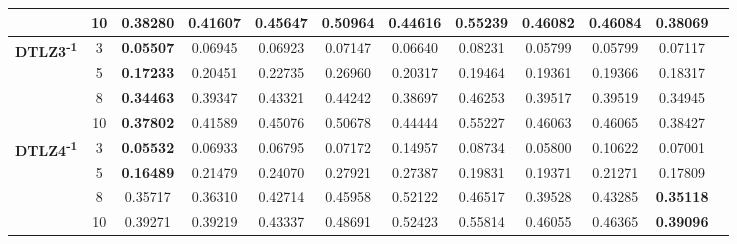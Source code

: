 \documentclass{sig-alternate}
\begin{document}
\begin{table*}[!htb]
\begin{tabular}{|c|c|c|c|c|c|c|c|c|c|c|c|}
                                                      & 10         & 0.38280          & 0.41607           & 0.45647               & 0.50964          & 0.44616             & 0.55239             & 0.46082            & 0.46084              & \textbf{0.38069} \\ \hline
\multirow{4}{*}{\textbf{DTLZ3\textsuperscript{-1}}} & 3          & \textbf{0.05507} & 0.06945           & 0.06923               & 0.07147          & 0.06640             & 0.08231             & 0.05799            & 0.05799              & 0.07117          \\ \cline{2-11} 
                                                      & 5          & \textbf{0.17233} & 0.20451           & 0.22735               & 0.26960          & 0.20317             & 0.19464             & 0.19361            & 0.19366              & 0.18317          \\ \cline{2-11} 
                                                      & 8          & \textbf{0.34463} & 0.39347           & 0.43321               & 0.44242          & 0.38697             & 0.46253             & 0.39517            & 0.39519              & 0.34945          \\ \cline{2-11} 
                                                      & 10         & \textbf{0.37802} & 0.41589           & 0.45076               & 0.50678          & 0.44444             & 0.55227             & 0.46063            & 0.46065              & 0.38427          \\ \hline
\multirow{4}{*}{\textbf{DTLZ4\textsuperscript{-1}}} & 3          & \textbf{0.05532} & 0.06933           & 0.06795               & 0.07172          & 0.14957             & 0.08734             & 0.05800            & 0.10622              & 0.07001          \\ \cline{2-11} 
                                                      & 5          & \textbf{0.16489} & 0.21479           & 0.24070               & 0.27921          & 0.27387             & 0.19831             & 0.19371            & 0.21271              & 0.17809          \\ \cline{2-11} 
                                                      & 8          & 0.35717          & 0.36310           & 0.42714               & 0.45958          & 0.52122             & 0.46517             & 0.39528            & 0.43285              & \textbf{0.35118} \\ \cline{2-11} 
                                                      & 10         & 0.39271          & 0.39219           & 0.43337               & 0.48691          & 0.52423             & 0.55814             & 0.46055            & 0.46365              & \textbf{0.39096} \\ \hline

\end{tabular}
\end{table*}
\end{document}

